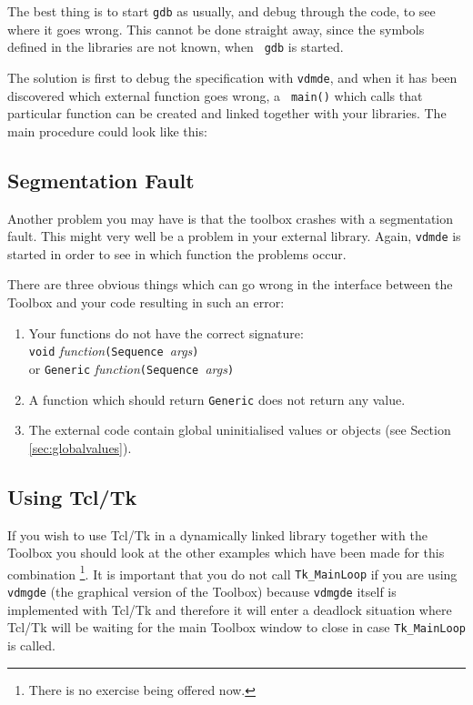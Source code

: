 \documentclass[\pformat,12pt]{article}
\begin{document}
The best thing is to start {\tt gdb} as usually, and debug through the
code, to see where it goes wrong. This cannot be done straight away,
since the symbols defined in the libraries are not known, when {\tt
  gdb} is started.

The solution is first to debug the specification with {\tt vdmde}, and
when it has been discovered which external function goes wrong, a {\tt
  main()} which calls that particular function can be created and
linked together with your libraries. The main procedure could look
like this:



\subsection{Segmentation Fault}

Another problem you may have is that the toolbox crashes with a
segmentation fault. This might very well be a problem in your external
library. Again, {\tt vdmde} is started in order to see in which
function the problems occur.

There are three obvious things which can go wrong in the interface
between the Toolbox and your code resulting in such an error:

\begin{enumerate}
\item Your functions do not have the correct signature:\\
  {\tt void} {\em function\/}{\tt (Sequence }{\em args\/}{\tt )}\\
  or {\tt Generic} {\em function\/}{\tt (Sequence }{\em args\/}{\tt )}
\item A function which should return {\tt Generic} does not return any
  value.
\item The external code contain global uninitialised values or objects
  (see Section \ref{sec:globalvalues}).
\end{enumerate}

\subsection{Using Tcl/Tk}

If you wish to use Tcl/Tk in a dynamically linked library together
with the Toolbox you should look at the other examples which have been
made for this combination \footnote{There is no exercise being offered now.}.
It is important that you do not call {\tt Tk\_MainLoop} 
if you are using {\tt vdmgde} (the graphical version of the Toolbox) 
because {\tt vdmgde} itself is implemented with Tcl/Tk and 
therefore it will enter a deadlock situation where Tcl/Tk will be waiting 
for the main Toolbox window to close in case {\tt Tk\_MainLoop} is called.
\end{document}

